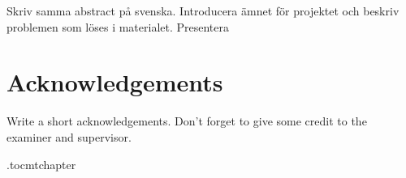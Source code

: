 Skriv samma abstract på svenska. Introducera ämnet för projektet och beskriv problemen som löses i materialet. Presentera


\newpage
\thispagestyle{plain}
\chapter*{Acknowledgements}
Write a short acknowledgements. Don't forget to give some credit to the examiner and supervisor.

\newpage

\etocdepthtag.toc{mtchapter}
\thispagestyle{plain}
\tableofcontents

\newpage


